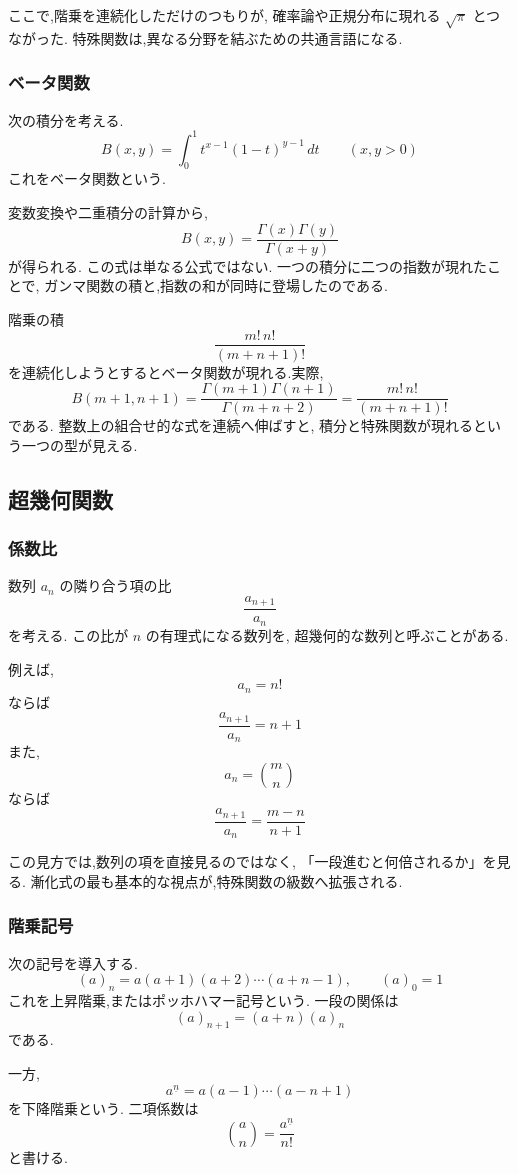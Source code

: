 ここで,階乗を連続化しただけのつもりが,
確率論や正規分布に現れる $\sqrt{\pi}$ とつながった.
特殊関数は,異なる分野を結ぶための共通言語になる.

\subsubsection{ベータ関数}

次の積分を考える.
\[
  B(x,y)=\int_0^1 t^{x-1}(1-t)^{y-1}\,dt
  \qquad (x,y>0)
\]
これをベータ関数という.

変数変換や二重積分の計算から,
\[
  B(x,y)=\frac{\Gamma(x)\Gamma(y)}{\Gamma(x+y)}
\]
が得られる.
この式は単なる公式ではない.
一つの積分に二つの指数が現れたことで,
ガンマ関数の積と,指数の和が同時に登場したのである.

階乗の積
\[
  \frac{m!\,n!}{(m+n+1)!}
\]
を連続化しようとするとベータ関数が現れる.実際,
\[
  B(m+1,n+1)=\frac{\Gamma(m+1)\Gamma(n+1)}{\Gamma(m+n+2)}=\frac{m!\,n!}{(m+n+1)!}
\]
である.
整数上の組合せ的な式を連続へ伸ばすと,
積分と特殊関数が現れるという一つの型が見える.

\subsection{超幾何関数}

\subsubsection{係数比}

数列 $a_n$ の隣り合う項の比
\[
  \frac{a_{n+1}}{a_n}
\]
を考える.
この比が $n$ の有理式になる数列を,
超幾何的な数列と呼ぶことがある.

例えば,
\[
  a_n=n!
\]
ならば
\[
  \frac{a_{n+1}}{a_n}=n+1
\]
また,
\[
  a_n=\binom{m}{n}
\]
ならば
\[
  \frac{a_{n+1}}{a_n}
  =\frac{m-n}{n+1}
\]

この見方では,数列の項を直接見るのではなく,
「一段進むと何倍されるか」を見る.
漸化式の最も基本的な視点が,特殊関数の級数へ拡張される.

\subsubsection{階乗記号}

次の記号を導入する.
\[
  (a)_n=a(a+1)(a+2)\cdots(a+n-1),
  \qquad (a)_0=1
\]
これを上昇階乗,またはポッホハマー記号という.
一段の関係は
\[
  (a)_{n+1}=(a+n)(a)_n
\]
である.

一方,
\[
  a^{\underline n}
  =a(a-1)\cdots(a-n+1)
\]
を下降階乗という.
二項係数は
\[
  \binom{a}{n}
  =\frac{a^{\underline n}}{n!}
\]
と書ける.

